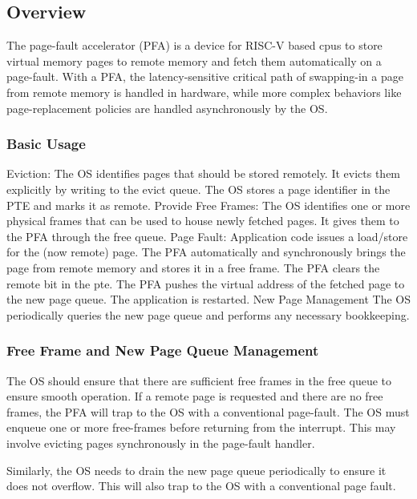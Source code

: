 \subsection{Overview}
The page-fault accelerator (PFA) is a device for RISC-V based cpus to store
virtual memory pages to remote memory and fetch them automatically on a
page-fault. With a PFA, the latency-sensitive critical path of swapping-in a
page from remote memory is handled in hardware, while more complex behaviors
like page-replacement policies are handled asynchronously by the OS.

\subsubsection{Basic Usage}
\begin{outline}[enumerate]
\1 Eviction:
    \2 The OS identifies pages that should be stored remotely.
    \2 It evicts them explicitly by writing to the evict queue.
    \2 The OS stores a page identifier in the PTE and marks it as remote.
\1 Provide Free Frames:
    \2 The OS identifies one or more physical frames that can be used to house
       newly fetched pages.
    \2 It gives them to the PFA through the free queue.
\1 Page Fault:
    \2 Application code issues a load/store for the (now remote) page.
    \2 The PFA automatically and synchronously brings the page from remote memory
       and stores it in a free frame.
    \2 The PFA clears the remote bit in the pte.
    \2 The PFA pushes the virtual address of the fetched page to the new page
       queue.
    \2 The application is restarted.
\1 New Page Management
    \2 The OS periodically queries the new page queue and performs any necessary
       bookkeeping.
\end{outline}

\subsubsection{Free Frame and New Page Queue Management}
The OS should ensure that there are sufficient free frames in the free queue to
ensure smooth operation. If a remote page is requested and there are no free
frames, the PFA will trap to the OS with a conventional page-fault. The OS must
enqueue one or more free-frames before returning from the interrupt. This may
involve evicting pages synchronously in the page-fault handler.

Similarly, the OS needs to drain the new page queue periodically to ensure it
does not overflow. This will also trap to the OS with a conventional page
fault.

